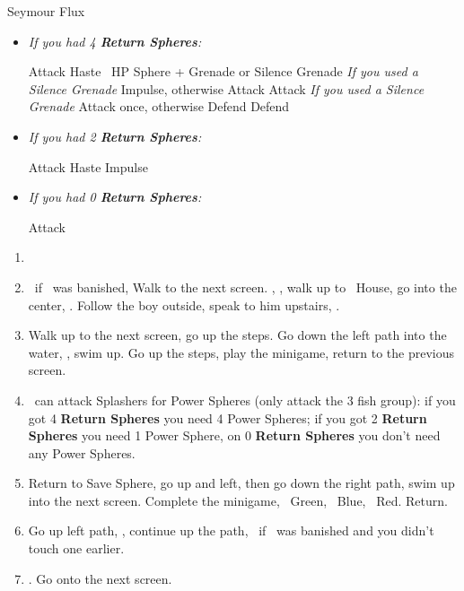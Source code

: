 \begin{battle}[70000]{Seymour Flux}
    \begin{itemize}
        \item \textit{If you had 4 \textbf{Return Spheres}:}
            \begin{itemize}
                \yunaf Attack
                \tidusf Haste \yuna
                \switch{\auron}{\rikku}
                \rikkuf \od\ HP Sphere + Grenade or Silence Grenade
                \summon{\bahamut}
                \bahamutf \textit{If you used a Silence Grenade} Impulse, otherwise Attack
                \yunaf Attack
                \tidusf \textit{If you used a Silence Grenade} Attack once, otherwise Defend
                \rikkuf Defend
            \end{itemize}
        \item \textit{If you had 2 \textbf{Return Spheres}:}
            \begin{itemize}
                \yunaf Attack
                \tidusf Haste \yuna
                \summon{\bahamut}
                \bahamutf Impulse
            \end{itemize}        
        \item \textit{If you had 0 \textbf{Return Spheres}:}
            \begin{itemize}
                \switch{\tidus}{\yuna}
                \summon{\bahamut}
                \bahamutf Attack
            \end{itemize}
    \end{itemize}
\end{battle}
\begin{enumerate}[resume]
    \item \formation{\tidus}{\kimahri}{\auron}
    \item \save\ if \bahamut\ was banished, Walk to the next screen. \skippablefmv[0:20], \sd, walk up to \tidus\ House, go into the center, \sd. Follow the boy outside, speak to him upstairs, \sd.
    \item Walk up to the next screen, go up the steps. Go down the left path into the water, \sd, swim up. Go up the steps, play the minigame, return to the previous screen.
    \item \tidus\ can attack Splashers for Power Spheres (only attack the 3 fish group): if you got 4 \textbf{Return Spheres} you need 4 Power Spheres; if you got 2 \textbf{Return Spheres} you need 1 Power Sphere, on 0 \textbf{Return Spheres} you don't need any Power Spheres.
    \item Return to Save Sphere, go up and left, then go down the right path, swim up into the next screen. Complete the minigame, \rikku\ Green, \tidus\ Blue, \wakka\ Red. Return.
    \item Go up left path, \sd, continue up the path, \save\ if \bahamut\ was banished and you didn't touch one earlier.
    \item \formation{\tidus}{\yuna}{\wakka}. Go onto the next screen.
\end{enumerate}
